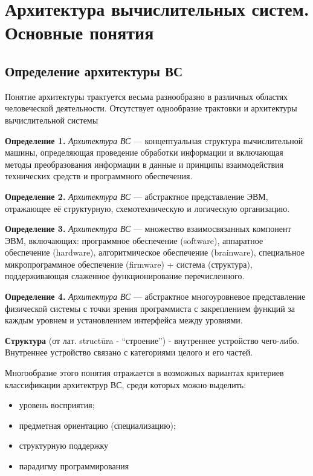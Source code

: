 
\chapter{Архитектура вычислительных систем. Основные понятия}

\section{Определение архитектуры ВС}

Понятие архитектуры трактуется весьма разнообразно в различных областях человеческой деятельности. Отсутствует однообразие трактовки и архитектуры вычислительной системы

\textbf{Определение 1.} \textit{Архитектура ВС} --- концептуальная структура вычислительной машины, определяющая проведение обработки информации и включающая методы преобразования информации в данные и принципы взаимодействия технических средств и программного обеспечения.

\textbf{Определение 2.} \textit{Архитектура ВС} --- абстрактное представление ЭВМ, отражающее её структурную, схемотехническую и логическую организацию.

\textbf{Определение 3.} \textit{Архитектура ВС} --- множество взаимосвязанных компонент ЭВМ, включающих: программное обеспечение (software), аппаратное обеспечение (hardware), алгоритмическое обеспечение (brainware), специальное микропрограммное обеспечение (firmware) + система (структура), поддерживающая слаженное функционирование перечисленного.

\textbf{Определение 4.} \textit{Архитектура ВС} --- абстрактное многоуровневое представление физической системы с точки зрения программиста с закреплением функций за каждым уровнем и установлением интерфейса между уровнями.

\textbf{Структура} (от лат. structūra - “строение”) - внутреннее устройство чего-либо. Внутреннее устройство связано с категориями целого и его частей.

Многообразие этого понятия отражается в возможных вариантах критериев классификации архитектрур ВС, среди которых можно выделить:

\begin{itemize}
    \item уровень восприятия;
    \item предметная ориентацию (специализацию);
    \item структурную поддержку
    \item парадигму программирования
\end{itemize}

